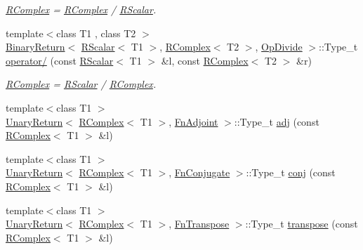 \begin{DoxyCompactItemize}
\begin{DoxyCompactList}\small\item\em \mbox{\hyperlink{classENSEM_1_1RComplex}{R\+Complex}} = \mbox{\hyperlink{classENSEM_1_1RComplex}{R\+Complex}} / \mbox{\hyperlink{classENSEM_1_1RScalar}{R\+Scalar}}. \end{DoxyCompactList}\item 
{\footnotesize template$<$class T1 , class T2 $>$ }\\\mbox{\hyperlink{structENSEM_1_1BinaryReturn}{Binary\+Return}}$<$ \mbox{\hyperlink{classENSEM_1_1RScalar}{R\+Scalar}}$<$ T1 $>$, \mbox{\hyperlink{classENSEM_1_1RComplex}{R\+Complex}}$<$ T2 $>$, \mbox{\hyperlink{structENSEM_1_1OpDivide}{Op\+Divide}} $>$\+::Type\+\_\+t \mbox{\hyperlink{group__rcomplex_gacaba74ac4d092284f9b979ce552b8beb}{operator/}} (const \mbox{\hyperlink{classENSEM_1_1RScalar}{R\+Scalar}}$<$ T1 $>$ \&l, const \mbox{\hyperlink{classENSEM_1_1RComplex}{R\+Complex}}$<$ T2 $>$ \&r)
\begin{DoxyCompactList}\small\item\em \mbox{\hyperlink{classENSEM_1_1RComplex}{R\+Complex}} = \mbox{\hyperlink{classENSEM_1_1RScalar}{R\+Scalar}} / \mbox{\hyperlink{classENSEM_1_1RComplex}{R\+Complex}}. \end{DoxyCompactList}\item 
{\footnotesize template$<$class T1 $>$ }\\\mbox{\hyperlink{structENSEM_1_1UnaryReturn}{Unary\+Return}}$<$ \mbox{\hyperlink{classENSEM_1_1RComplex}{R\+Complex}}$<$ T1 $>$, \mbox{\hyperlink{structENSEM_1_1FnAdjoint}{Fn\+Adjoint}} $>$\+::Type\+\_\+t \mbox{\hyperlink{group__rcomplex_ga4cb16a1d0f8f130aeb4daf0967a43c7e}{adj}} (const \mbox{\hyperlink{classENSEM_1_1RComplex}{R\+Complex}}$<$ T1 $>$ \&l)
\item 
{\footnotesize template$<$class T1 $>$ }\\\mbox{\hyperlink{structENSEM_1_1UnaryReturn}{Unary\+Return}}$<$ \mbox{\hyperlink{classENSEM_1_1RComplex}{R\+Complex}}$<$ T1 $>$, \mbox{\hyperlink{structENSEM_1_1FnConjugate}{Fn\+Conjugate}} $>$\+::Type\+\_\+t \mbox{\hyperlink{group__rcomplex_gaa21f7147b1663d93c675ea24647c9158}{conj}} (const \mbox{\hyperlink{classENSEM_1_1RComplex}{R\+Complex}}$<$ T1 $>$ \&l)
\item 
{\footnotesize template$<$class T1 $>$ }\\\mbox{\hyperlink{structENSEM_1_1UnaryReturn}{Unary\+Return}}$<$ \mbox{\hyperlink{classENSEM_1_1RComplex}{R\+Complex}}$<$ T1 $>$, \mbox{\hyperlink{structENSEM_1_1FnTranspose}{Fn\+Transpose}} $>$\+::Type\+\_\+t \mbox{\hyperlink{group__rcomplex_gaadd686b6457e8156edd6c65c475e4eb5}{transpose}} (const \mbox{\hyperlink{classENSEM_1_1RComplex}{R\+Complex}}$<$ T1 $>$ \&l)

\end{DoxyCompactItemize}
